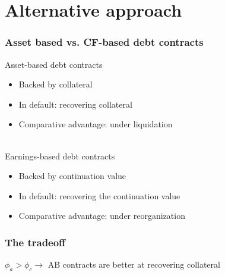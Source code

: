 \documentclass[notes]{beamer}
\begin{document}
\section{Alternative approach}

\begin{frame}[label=1] 
\frametitle{Asset based vs. CF-based debt contracts}
Asset-based debt contracts
\begin{itemize}
 \setlength\itemsep{0em}
    \item Backed by collateral 
    \item In default: recovering collateral
    \item Comparative advantage: under liquidation
\end{itemize} \vspace{5mm} \\

Earnings-based debt contracts
\begin{itemize}
 \setlength\itemsep{0em}
    \item Backed by continuation value 
    \item In default: recovering the continuation value
    \item Comparative advantage: under reorganization
\end{itemize} 

\end{frame}

\begin{frame}[label=2] \frametitle{The tradeoff}
\begin{table}[h!]
\centering
{}
\label{tab:shares}
\end{table}  
 $\phi_a > \phi_c \rightarrow $ AB contracts are better at recovering collateral

\end{frame}
\end{document}
